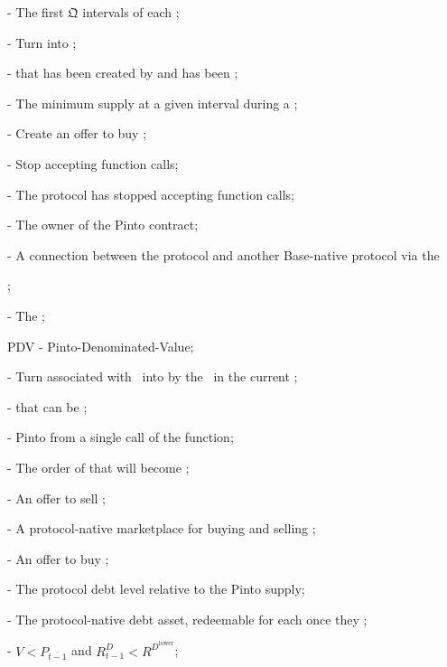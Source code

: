 \documentclass[class=article, crop=false]{standalone}
\begin{document}
\begin{itemize}[topsep=0pt, itemsep=3pt,leftmargin=16pt]
{    \item[]  - The first $\mathfrak{Q}$ intervals of each ;
    \item[]  - Turn  into ;
    \item[]  -  that has been created by  and has been ;
    \item[]  - The minimum  supply at a given interval during a ;
    \item[]  - Create an offer to buy ;
    \item[]  - Stop accepting  function calls;
    \item[]  - The protocol has stopped accepting  function calls;
    \item[]  - The owner of the Pinto contract;
    \item[]  - A connection between the protocol and another Base-native protocol via the };
    \item[]  - The ;
    \item[] PDV - Pinto-Denominated-Value;
    \item[]  - Turn  associated with  \Pinto\ into  by  the  \Pinto\ in the current ;
    \item[]  -  that can be ;
    \item[]  - Pinto  from a single call of the  function;
    \item[]  - The order of  that will become ;
    \item[]  - An offer to sell ;
    \item[]  - A protocol-native marketplace for buying and selling ;
    \item[]  - An offer to buy ;
    \item[]  - The protocol debt level relative to the Pinto supply;
    \item[]  - The protocol-native debt asset, redeemable for  each once they ;
    \item[]  - $V < P_{\overline{t-1}}$ and $R_{t-1}^{D} < R^{D^{\text{lower}}}$;

\end{itemize}
\end{document}
